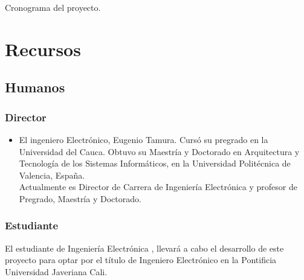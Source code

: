 \begin{table}
\begin{ganttchart}




\end{ganttchart}
\caption{Cronograma del proyecto. \label{cronograma}}
\end{table}


%


\section{Recursos}

\subsection{Humanos}
\subsubsection{Director}
\begin{itemize}
\item El ingeniero Electr\'onico, Eugenio Tamura. Curs\'o su pregrado en la Universidad del Cauca.
Obtuvo su Maestr\'ia y Doctorado en Arquitectura y Tecnolog\'ia de los Sistemas Inform\'aticos, en la Universidad Polit\'ecnica de Valencia, Espa\~na.\\
Actualmente es Director de Carrera de Ingenier\'ia Electr\'onica  y profesor de Pregrado, Maestr\'ia y Doctorado.

\end{itemize} 
\subsubsection{Estudiante}
El estudiante de Ingenier\'ia Electr\'onica  \authorA, llevar\'a a cabo el desarrollo de este proyecto para optar por el título de Ingeniero Electrónico en la Pontificia Universidad Javeriana Cali.



